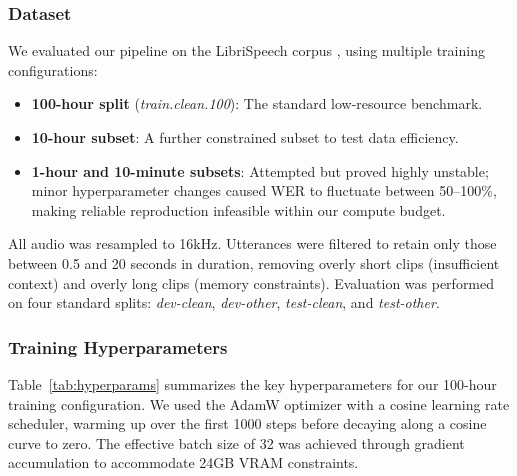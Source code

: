 \documentclass[conference]{IEEEtran}
\begin{document}
\subsubsection{Dataset}
We evaluated our pipeline on the LibriSpeech corpus \cite{librispeech}, using multiple training configurations:
\begin{itemize}
    \item \textbf{100-hour split} (\textit{train.clean.100}): The standard low-resource benchmark.
    \item \textbf{10-hour subset}: A further constrained subset to test data efficiency.
    \item \textbf{1-hour and 10-minute subsets}: Attempted but proved highly unstable;
    minor hyperparameter changes caused WER to fluctuate between 50--100\%, making reliable reproduction infeasible within our compute budget.
\end{itemize}
All audio was resampled to 16kHz. Utterances were filtered to retain only those between 0.5 and 20 seconds in duration, removing overly short clips (insufficient context) and overly long clips (memory constraints).
Evaluation was performed on four standard splits: \textit{dev-clean}, \textit{dev-other}, \textit{test-clean}, and \textit{test-other}.

\subsubsection{Training Hyperparameters}
Table~\ref{tab:hyperparams} summarizes the key hyperparameters for our 100-hour training configuration.
We used the AdamW optimizer with a cosine learning rate scheduler, warming up over the first 1000 steps before decaying along a cosine curve to zero.
The effective batch size of 32 was achieved through gradient accumulation to accommodate 24GB VRAM constraints.
\end{document}
